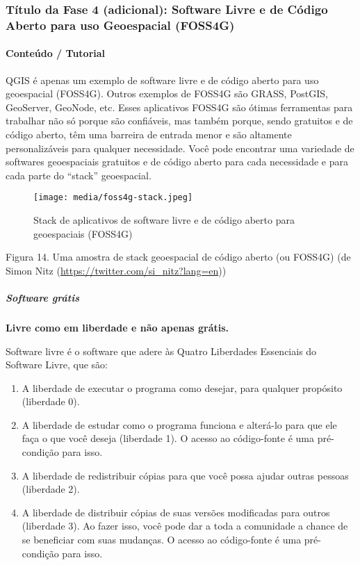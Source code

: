 \documentclass[
]{book}
\providecommand{\tightlist}{%
  \setlength{\itemsep}{0pt}\setlength{\parskip}{0pt}}
\theoremstyle{definition}
\theoremstyle{definition}
\theoremstyle{definition}
\theoremstyle{definition}
\theoremstyle{remark}
\begin{document}
\hypertarget{tuxedtulo-da-fase-4-adicional-software-livre-e-de-cuxf3digo-aberto-para-uso-geoespacial-foss4g}{%
\subsubsection{Título da Fase 4 (adicional): Software Livre e de Código Aberto para uso Geoespacial (FOSS4G)}\label{tuxedtulo-da-fase-4-adicional-software-livre-e-de-cuxf3digo-aberto-para-uso-geoespacial-foss4g}}

\hypertarget{conteuxfado-tutorial-3}{%
\paragraph{Conteúdo / Tutorial}\label{conteuxfado-tutorial-3}}

QGIS é apenas um exemplo de software livre e de código aberto para uso geoespacial (FOSS4G). Outros exemplos de FOSS4G são GRASS, PostGIS, GeoServer, GeoNode, etc. Esses aplicativos FOSS4G são ótimas ferramentas para trabalhar não só porque são confiáveis, mas também porque, sendo gratuitos e de código aberto, têm uma barreira de entrada menor e são altamente personalizáveis para qualquer necessidade. Você pode encontrar uma variedade de softwares geoespaciais gratuitos e de código aberto para cada necessidade e para cada parte do ``stack'' geoespacial.

\begin{figure}
\centering
\texttt{[image: media/foss4g-stack.jpeg]}
\caption{Stack de aplicativos de software livre e de código aberto para geoespaciais (FOSS4G)}
\end{figure}

Figura 14. Uma amostra de stack geoespacial de código aberto (ou FOSS4G) (de Simon Nitz (\url{https://twitter.com/si_nitz?lang=en}))

\hypertarget{software-gruxe1tis}{%
\subparagraph{Software grátis}\label{software-gruxe1tis}}

\textbf{Livre como em liberdade e não apenas grátis.}

Software livre é o software que adere às Quatro Liberdades Essenciais do Software Livre, que são:

\begin{enumerate}
\def\labelenumi{\arabic{enumi}.}
\tightlist
\item
  A liberdade de executar o programa como desejar, para qualquer propósito (liberdade 0).
\item
  A liberdade de estudar como o programa funciona e alterá-lo para que ele faça o que você deseja (liberdade 1). O acesso ao código-fonte é uma pré-condição para isso.
\item
  A liberdade de redistribuir cópias para que você possa ajudar outras pessoas (liberdade 2).
\item
  A liberdade de distribuir cópias de suas versões modificadas para outros (liberdade 3). Ao fazer isso, você pode dar a toda a comunidade a chance de se beneficiar com suas mudanças. O acesso ao código-fonte é uma pré-condição para isso.
\end{enumerate}
\end{document}
